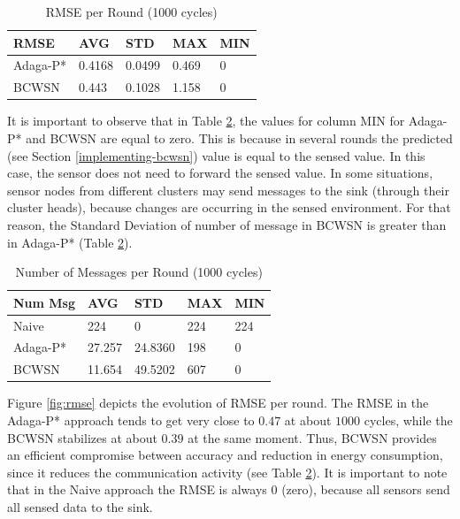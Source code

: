 \documentclass{acm_proc_article-sp}
\begin{document}
\begin{table}[h!]
\small
\caption{RMSE per Round (1000 cycles)}
\label{tab:rmse}
\begin{center}
\begin{tabular}{|l||l|l|l|l|}
\hline
RMSE &AVG &STD &MAX &MIN \\
\hline\hline
Adaga-P* &0.4168 &0.0499 &0.469 &0 \\
\hline
BCWSN &0.443 &0.1028 &1.158 &0 \\
\hline
\end{tabular}
\end{center}
\end{table}

It is important to observe that in Table \ref{tab:num-msg}, the values for column MIN for Adaga-P* and BCWSN are
equal to zero. This is because in several rounds the predicted (see Section \ref{implementing-bcwsn}) value is equal to the sensed
value. In this case, the sensor does not need to forward the sensed value. In some situations, sensor nodes from different clusters may send  messages to the sink (through their cluster heads), because changes are occurring 
in the sensed environment. For that reason, the Standard Deviation of number of message 
in BCWSN is greater than in Adaga-P* (Table \ref{tab:num-msg}).

\begin{table}[h!]
\small
\caption{Number of Messages per Round (1000 cycles)}
\label{tab:num-msg}
\begin{center}
\begin{tabular}{|l||l|l|l|l|}
\hline
Num Msg &AVG &STD &MAX &MIN \\
\hline\hline
Naive &224 &0 &224 &224 \\
\hline
Adaga-P* &27.257 &24.8360 &198 &0 \\
\hline
BCWSN &11.654 &49.5202 &607 &0 \\
\hline
\end{tabular}
\end{center}
\end{table}
\vspace*{-.3cm}


Figure \ref{fig:rmse} depicts the evolution of RMSE per round. The RMSE in the
Adaga-P* approach tends to get very close to $0.47$ at about $1000$ cycles,
while the BCWSN stabilizes at about $0.39$ at the same moment. Thus, BCWSN
provides an efficient compromise between accuracy and reduction in energy consumption,
since it reduces the communication activity (see Table \ref{tab:num-msg}). It is
important to note that in the Naive approach the RMSE is always 0 (zero),
because all sensors send all sensed data to the sink.
\vspace*{-.3cm}
\end{document}
